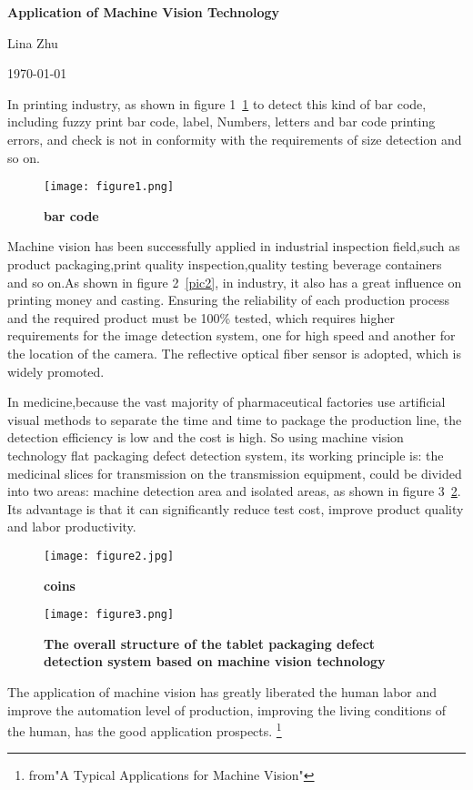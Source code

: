 \documentclass{article}
\begin{document}
	
	\begin{center}
		
		{\bfseries \LARGE Application of Machine Vision Technology} 
		
	\end{center}
	\begin{center}
		Lina Zhu
	\end{center}
	\begin{center}
		\today
	\end{center}
	
	\par  In printing industry, as shown in figure 1~\ref{pic1} to detect this kind of bar code, including fuzzy print bar code, label, Numbers, letters and bar code printing errors, and check is not in conformity with the requirements of size detection and so on.
\begin{figure}[htp]
	\centering
	\texttt{[image: figure1.png]}
	\caption{\bfseries{bar code}}\label{pic1}
		\end{figure}
	\par Machine vision has been successfully applied in industrial inspection field,such as product packaging,print quality inspection,quality testing beverage containers and so on.As shown in figure 2~\ref{pic2}, in industry, it also has a great influence on printing money and casting. Ensuring the reliability of each production process and the required product must be 100\% tested, which requires higher requirements for the image detection system, one for high speed and another for the location of the camera. The reflective optical fiber sensor is adopted, which is widely promoted.
	\par In medicine,because the vast majority of pharmaceutical factories use artificial visual methods to separate the time and time to package the production line, the detection efficiency is low and the cost is high. So using machine vision technology flat packaging defect detection system, its working principle is: the medicinal slices for transmission on the transmission equipment, could be divided into two areas: machine detection area and isolated areas, as shown in figure 3~\ref{pic3}. Its advantage is that it can significantly reduce test cost, improve product quality and labor productivity.
	\begin{figure}[htp]
		\centering
		\texttt{[image: figure2.jpg]}
		\caption{\bfseries{coins}}\label{pic2}
			\centering
		\texttt{[image: figure3.png]}
		\caption{	\bfseries{The overall structure of the tablet packaging defect detection system based on machine vision technology}}\label{pic3}
	
	\end{figure}
	\par The application of machine vision has greatly liberated the human labor and improve the automation level of production, improving the living conditions of the human, has the good application prospects. 
	\footnote{from"A Typical Applications for Machine Vision"} 
	
\end{document}

